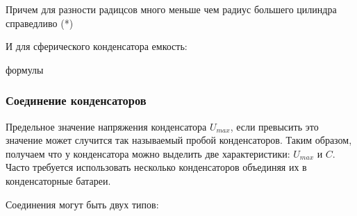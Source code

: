 \documentclass[../main.tex]{subfiles}
\begin{document}
Причем для разности радицсов много меньше чем радиус большего цилиндра справедливо (*)

И для сферического конденсатора емкость:

формулы

\subsubsection{Соединение конденсаторов}

Предельное значение напряжения конденсатора $U_{max}$, если превысить это значение может случится так называемый пробой конденсаторов.
Таким образом, получаем что у конденсатора можно выделить две характеристики: $U_{max}$ и $C$. Часто требуется использовать несколько
конденсаторов объединяя их в конденсаторные батареи.

Соединения могут быть двух типов:
\end{document}
